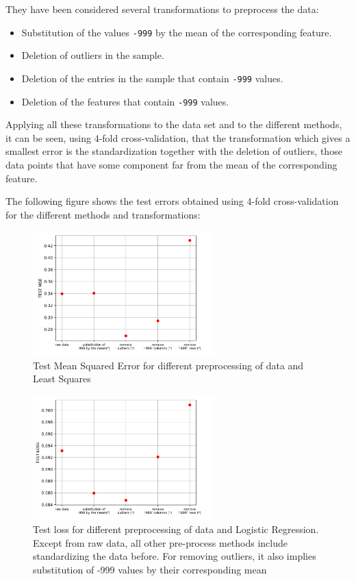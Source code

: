 \documentclass[10pt,conference]{IEEEtran}
\begin{document}
They have been considered several transformations to preprocess the data: 
\begin{itemize}
\item Substitution of the values \verb|-999| by the mean of the corresponding feature.
\item Deletion of outliers in the sample.
\item Deletion of the entries in the sample that contain \verb|-999| values.
\item Deletion of the features that contain \verb|-999| values.
\end{itemize}

Applying all these transformations to the data set and to the different methods, it can be seen, using 4-fold cross-validation, that the transformation which gives a smallest error is the standardization together with the deletion of outliers, those data points that have some component far from the mean of the corresponding feature. 

The following figure shows the test errors obtained using 4-fold cross-validation for the different methods and transformations:

\begin{figure}[ht!]
	\centering
	\includegraphics[width=265px]{LEAST_SQUARES_DATA_PRE-PROCESS.png}
	\caption{Test Mean Squared Error for different preprocessing of data and Least Squares}
   \label{figure 1}
\end{figure}

\begin{figure}[ht!]
	\centering
	\includegraphics[width=265px]{Log_reg_DATA_PRE-PROCESS.png}
	\caption{Test loss for different preprocessing of data and Logistic Regression. Except from raw data, all other pre-process methods include standardizing the data before. For removing outliers, it also implies substitution of -999 values by their corresponding mean} 
\label{figure 2}
\end{figure}
\end{document}

